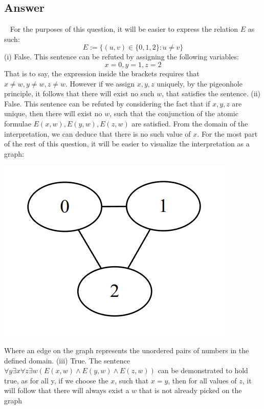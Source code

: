 \documentclass[12pt]{fphw}
\begin{document}
\subsection*{Answer} \ \newline
For the purposes of this question, it will be easier to express the relation $E$ as such:
$$
E := \{(u,v) \in \{0,1,2\} : u \neq v \}
$$
(i) False. This sentence can be refuted by assigning the following variables:
$$
x = 0, y = 1, z = 2
$$
That is to say, the expression inside the brackets requires that $x \neq w, y \neq w, z \neq w$. However if we assign $x,y,z$ uniquely, by the pigeonhole principle, it follows that there will exist no such $w$, that satisfies the sentence. \newline \newline
(ii) False. This sentence can be refuted by considering the fact that if $x, y, z$ are unique, then there will exist no $w$, such that the conjunction of the atomic formulae $E(x,w), E(y,w), E(z,w)$ are satisfied. From the domain of the interpretation, we can deduce that there is no such value of $x$. \newline \newline
For the most part of the rest of this question, it will be easier to visualize the interpretation as a graph:
\begin{center}
    \includegraphics[scale=0.5]{q5-graph.png}
\end{center}
Where an edge on the graph represents the unordered pairs of numbers in the defined domain. \newline \newline
(iii) True. The sentence $\forall y \exists x \forall z \exists w (E(x,w) \wedge E(y,w) \wedge E(z,w))$ can be demonstrated to hold true, as for all y, if we choose the $x$, such that $x = y$, then for all values of $z$, it will follow that there will always exist a $w$ that is not already picked on the graph \newline \newline
\end{document}
